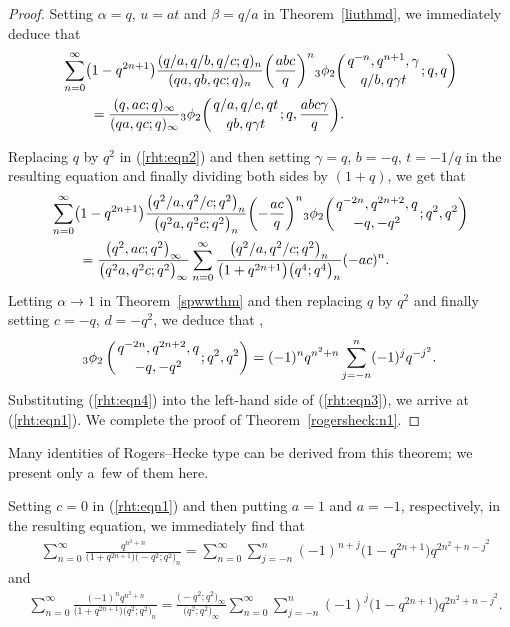 \documentclass[10pt,a4paper]{amsart}
\numberwithin{equation}{section}
\begin{document}
\begin{proof}
Setting $\alpha=q$, $u=at$ and $\beta=q/a$ in Theorem~\ref{liuthmd}, we immediately deduce that
\begin{align}
	&\sum_{n=0}^\infty\bigl(1-q^{2n+1}\bigr) \frac{(q/a, q/b, q/c; q)_n}{(qa, qb, qc; q)_n} \biggl(\frac{abc}{q}\biggr)^n {_3\phi_2}\biggl({{q^{-n}, q^{n+1}, \gamma}\atop{q/b, q\gamma t}}; q, q\biggr)\nonumber\\
	&\qquad{}=\frac{(q, ac; q)_\infty}{(qa, qc; q)_\infty}
	{_3\phi_2}\biggl({{q/a, q/c, qt}\atop{qb, q\gamma t}}; q, \frac{abc\gamma}{q}\biggr).\label{rht:eqn2}	
\end{align}		
	
Replacing $q$ by $q^2$ in (\ref{rht:eqn2}) and then setting $\gamma=q$, $b=-q$, $t=-1/q$ in the resulting equation and finally dividing both sides by $(1+q)$, we get that
\begin{align}	
&\sum_{n=0}^\infty \bigl(1-q^{2n+1}\bigr)	\frac{\bigl(q^2/a, q^2/c; q^2\bigr)_n}{\bigl(q^2a, q^2 c; q^2\bigr)_n}\biggl(-\frac{ac}{q}\biggr)^n {_3\phi_2}\biggl({{q^{-2n}, q^{2n+2}, q}\atop{-q, -q^2}}; q^2, q^2\biggr)\nonumber\\
&\qquad{}=\frac{\bigl(q^2, ac; q^2\bigr)_\infty}{\bigl(q^2a, q^2c; q^2\bigr)_\infty}
\sum_{n=0}^\infty \frac{\bigl(q^2/a, q^2/c; q^2\bigr)_n}{\bigl(1+q^{2n+1}\bigr)\bigl(q^4; q^4\bigr)_n} (-ac)^n.\label{rht:eqn3}
\end{align}
Letting $\alpha \to 1$ in Theorem~\ref{spwwthm} and then replacing $q$ by $q^2$ and finally setting $c=-q$, $d=-q^2$, we deduce that \cite[equation~(6.15)]{Andrews2012}, \cite[equation~(4.5)]{Liu2013IJTN}
\begin{align}\label{rht:eqn4}	
	{_3\phi_2}\left({{q^{-2n}, q^{2n+2}, q }\atop{-q, -q^2}}; q^2, q^2\right)=(-1)^n q^{n^2+n}\sum_{j=-n}^n (-1)^j q^{-j^2}.
\end{align}
Substituting (\ref{rht:eqn4}) into the left-hand side of (\ref{rht:eqn3}), we arrive at (\ref{rht:eqn1}). We complete the proof of Theorem~\ref{rogersheck:n1}.
\end{proof}

Many identities of Rogers--Hecke type can be derived from this theorem; we present only a~few of them here.
		
Setting $c=0$ in (\ref{rht:eqn1}) and then putting $a=1$ and $a=-1$, respectively, in the resulting equation, we immediately find that
\begin{align*}%
&\sum_{n=0}^\infty \frac{q^{n^2+n}}{\bigl(1+q^{2n+1}\bigr)\bigl(-q^2; q^2\bigr)_n}
=\sum_{n=0}^\infty \sum_{j=-n}^n (-1)^{n+j} \bigl(1-q^{2n+1}\bigr) q^{2n^2+n-j^2}
\end{align*}
and
\begin{align*}%
&\sum_{n=0}^\infty \frac{(-1)^n q^{n^2+n}}{\bigl(1+q^{2n+1}\bigr)\bigl(q^2; q^2\bigr)_n}
=\frac{\bigl(-q^2; q^2\bigr)_\infty}{\bigl(q^2; q^2\bigr)_\infty}\sum_{n=0}^\infty \sum_{j=-n}^n (-1)^{j} \bigl(1-q^{2n+1}\bigr) q^{2n^2+n-j^2}. 	
\end{align*}
\end{document}
